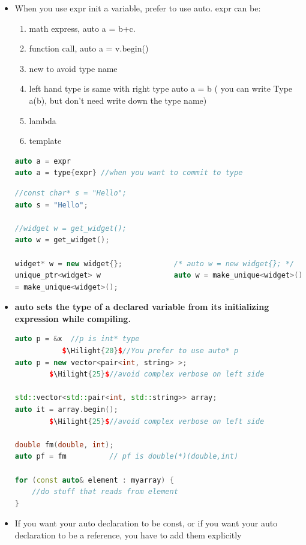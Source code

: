 \documentclass[a4paper,12pt,twoside]{book}
\newcommand{\Hilight}[1]{\makebox[0pt][l]{\color{yellow}\rule[-3pt]{#1em}{11pt}}}
\begin{document}
\begin{itemize}
	\item When you use expr init a variable, prefer to use auto. expr can be:
\begin{enumerate}
	\item math express, auto a = b+c.
	\item function call, auto a = v.begin()
	\item new to avoid type name
	\item left hand type is same with right type auto a = b ( you can write Type a(b), but don't need write down the type name)
	\item lambda
	\item template 
\end{enumerate}
\begin{lstlisting}[frame=single, language=c++]
auto a = expr
auto a = type{expr} //when you want to commit to type
\end{lstlisting}

\begin{lstlisting}[frame=single, language=c++]
//const char* s = "Hello";             
auto s = "Hello";

//widget w = get_widget();             
auto w = get_widget();

widget* w = new widget{};            /* auto w = new widget{}; */
unique_ptr<widget> w                 auto w = make_unique<widget>();
= make_unique<widget>();
\end{lstlisting}

	\item \textbf{auto sets the type of a declared variable from its initializing expression while compiling.}
	
\begin{lstlisting}[frame=single, language=c++]
auto p = &x  //p is int* type
	       $\Hilight{20}$//You prefer to use auto* p
auto p = new vector<pair<int, string> >; 
        $\Hilight{25}$//avoid complex verbose on left side

std::vector<std::pair<int, std::string>> array;
auto it = array.begin();    
        $\Hilight{25}$//avoid complex verbose on left side
	
double fm(double, int);
auto pf = fm          // pf is double(*)(double,int)

for (const auto& element : myarray) {
	//do stuff that reads from element
}
\end{lstlisting}
	
	\item If you want your auto declaration to be const, or if you want your auto declaration to be a reference, you have to add them explicitly
	

\end{itemize}
\end{document}
